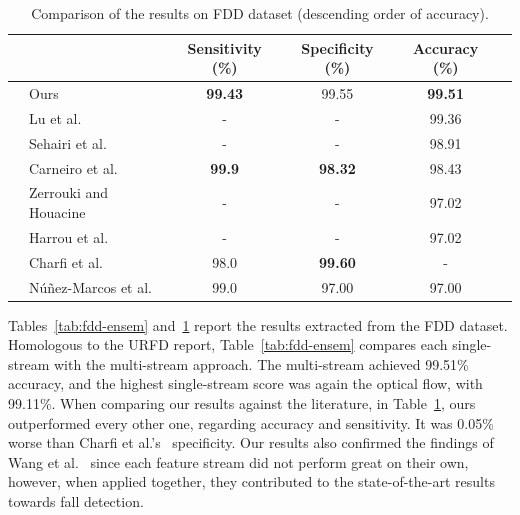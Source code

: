 \documentclass[conference]{IEEEtran}
\begin{document}
\begin{table}[]
\centering
\caption{Comparison of the results on FDD dataset (descending order of accuracy).}
\label{tab:fdd-our-their}
\begin{tabular}{llcccl}
\hline
 &                                                      & Sensitivity (\%)  & Specificity (\%)  & Accuracy (\%)     & \\ \hline
 & Ours                                                 & \textbf{99.43}    & 99.55             & \textbf{99.51}    & \\
 & Lu et al.~\cite{lu2018deep}                          & -                 & -                 & 99.36             & \\
 & Sehairi et al.~\cite{sehairi2018elderly}             & -                 & -                 & 98.91             & \\
 & Carneiro et al.~\cite{carneiro2019multi}                                                 & \textbf{99.9}      & \textbf{98.32}    & 98.43             & \\
 & Zerrouki and Houacine~\cite{zerrouki2018combined}    & -                 & -                 & 97.02             & \\
 & Harrou et al.~\cite{harrou2017vision}                & -                 & -                 & 97.02             & \\
 & Charfi et al.~\cite{charfi2012definition}            & 98.0              & \textbf{99.60}    & -                 & \\
 & N\'u\~nez-Marcos et al.~\cite{nunez2017vision}       & 99.0              & 97.00             & 97.00             & \\ \hline
\end{tabular}
\end{table}
Tables~\ref{tab:fdd-ensem} and~\ref{tab:fdd-our-their} report the results extracted from the FDD dataset. Homologous to the URFD report, Table~\ref{tab:fdd-ensem} compares each single-stream with the multi-stream approach. The multi-stream achieved 99.51\% accuracy, and the highest single-stream score was again the optical flow, with 99.11\%. When comparing our results against the literature, in Table~\ref{tab:fdd-our-their}, ours outperformed every other one, regarding accuracy and sensitivity. It was 0.05\% worse than Charfi et al.'s~\cite{charfi2013optimised} specificity. Our results also confirmed the findings of Wang et al.~\cite{wang2015towards} since each feature stream did not perform great on their own, however, when applied together, they contributed to the state-of-the-art results towards fall detection.
 
\end{document}

